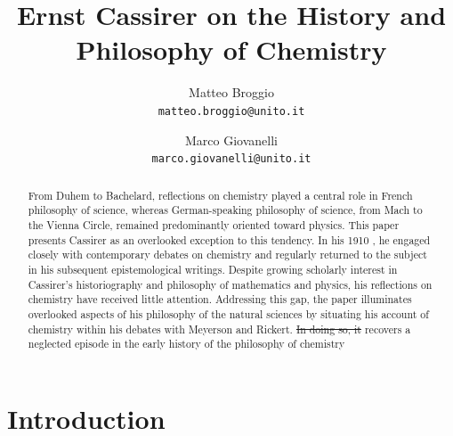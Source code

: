 \documentclass[submitted,12pt]{article}
\title{Ernst Cassirer on the History and Philosophy of Chemistry}
\author{\small
Matteo Broggio\\
  \texttt{matteo.broggio@unito.it}
  \and
\small  Marco Giovanelli\\
  \texttt{marco.giovanelli@unito.it}
}
\providecommand{\DIFadd}[1]{{\protect\color{blue}\uwave{#1}}} %
\providecommand{\DIFdel}[1]{{\protect\color{red}\sout{#1}}}                      %
\providecommand{\DIFaddbegin}{} %
\providecommand{\DIFaddend}{} %
\providecommand{\DIFdelbegin}{} %
\providecommand{\DIFdelend}{} %
\begin{document}
\maketitle


\begin{abstract}
From Duhem to Bachelard, reflections on chemistry played a central role in French philosophy of science, whereas German-speaking philosophy of science, from Mach to the Vienna Circle, remained predominantly oriented toward physics. This paper presents Cassirer as an overlooked exception to this tendency. In his 1910 \SFt, he engaged closely with contemporary debates on chemistry and regularly returned to the subject in his subsequent epistemological writings. Despite growing scholarly interest in Cassirer’s historiography and philosophy of mathematics and physics, his reflections on chemistry have received little attention. Addressing this gap, the paper illuminates overlooked aspects of his philosophy of the natural sciences by situating his account of chemistry within his debates with Meyerson and Rickert. \DIFdelbegin \DIFdel{In doing so, it }\DIFdelend \DIFaddbegin \DIFadd{It }\DIFaddend recovers a neglected episode in the early history of the philosophy of chemistry\DIFaddbegin \DIFadd{.}\DIFaddend {}
\end{abstract}

\section*{Introduction}
\end{document}
